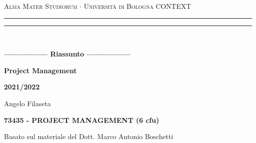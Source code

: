 \begin{titlepage}
    \begin{center}
        {{\Large{\textsc{Alma Mater Studiorum $\cdot$ Università di Bologna}}}}
        {{\Large{\textsc{CONTEXT}}}}
        \rule[0.1cm]{15.8cm}{0.1mm}
        \rule[0.5cm]{15.8cm}{0.6mm}
        \\
        \vspace{3mm}
    \end{center}
    \vspace{2mm}
    \begin{center}
        {\LARGE{\bf{----------------- Riassunto -----------------}}}
        \vspace{5mm} \par \noindent
        {\Huge{\bf{Project Management}}}
        \vspace{10mm} \par \noindent
        {\LARGE \bf{2021/2022}}
        \vspace{15mm} \par \noindent
        {\Large Angelo Filaseta}
        \vspace{15mm} \par \noindent
        {\LARGE \bf{73435 - PROJECT MANAGEMENT (6 cfu)}}
        \vspace{8mm} \par \noindent
        {\Large Basato sul materiale del Dott. Marco Antonio Boschetti ~\cite{MarcoAnt98:online}}
	\end{center}
    \hfill
    \vspace{40mm}
\end{titlepage}
